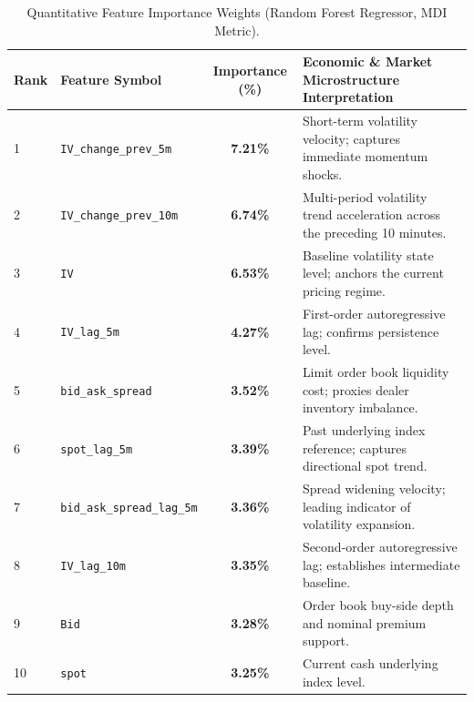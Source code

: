 \begin{table}[H]
    \centering
    \scriptsize
    \renewcommand{\arraystretch}{0.88}
    \caption{Quantitative Feature Importance Weights (Random Forest Regressor, MDI Metric).}
    \label{tab:feature_importance_breakdown}
    \begin{tabularx}{\textwidth}{llcX}
        \toprule
        \textbf{Rank} & \textbf{Feature Symbol} & \textbf{Importance (\%)} & \textbf{Economic \& Market Microstructure Interpretation} \\
        \midrule
        1 & \texttt{IV\_change\_prev\_5m} & \textbf{7.21\%} & Short-term volatility velocity; captures immediate momentum shocks. \\
        2 & \texttt{IV\_change\_prev\_10m} & \textbf{6.74\%} & Multi-period volatility trend acceleration across the preceding 10 minutes. \\
        3 & \texttt{IV} & \textbf{6.53\%} & Baseline volatility state level; anchors the current pricing regime. \\
        4 & \texttt{IV\_lag\_5m} & \textbf{4.27\%} & First-order autoregressive lag; confirms persistence level. \\
        5 & \texttt{bid\_ask\_spread} & \textbf{3.52\%} & Limit order book liquidity cost; proxies dealer inventory imbalance. \\
        6 & \texttt{spot\_lag\_5m} & \textbf{3.39\%} & Past underlying index reference; captures directional spot trend. \\
        7 & \texttt{bid\_ask\_spread\_lag\_5m} & \textbf{3.36\%} & Spread widening velocity; leading indicator of volatility expansion. \\
        8 & \texttt{IV\_lag\_10m} & \textbf{3.35\%} & Second-order autoregressive lag; establishes intermediate baseline. \\
        9 & \texttt{Bid} & \textbf{3.28\%} & Order book buy-side depth and nominal premium support. \\
        10 & \texttt{spot} & \textbf{3.25\%} & Current cash underlying index level. \\
        \bottomrule
    \end{tabularx}
\end{table}

